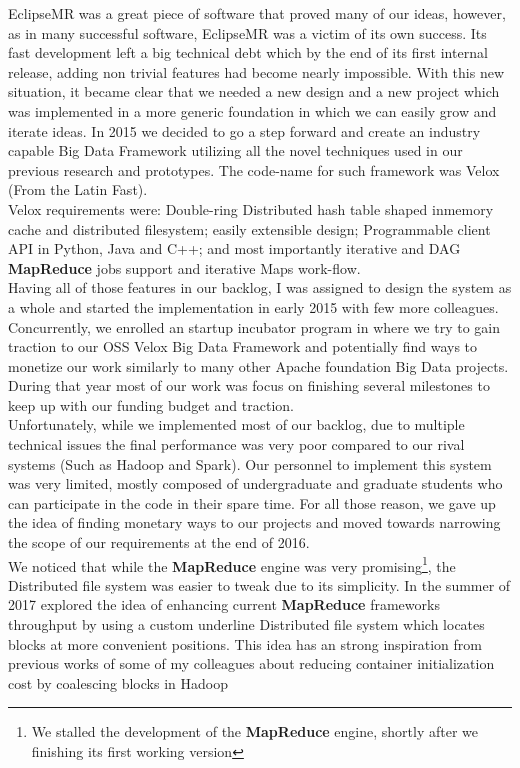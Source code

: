 EclipseMR was a great piece of software that proved many of our ideas, however,
as in many successful software, EclipseMR was a victim of its own success. Its
fast development left a big technical debt which by the end of its first
internal release, adding non trivial features had become nearly impossible.
With this new situation, it became clear that we needed a new design and a new
project which was implemented in a more generic foundation in which we can
easily grow and iterate ideas. In 2015 we decided to go a step forward and
create an industry capable Big Data Framework utilizing all the novel
techniques used in our previous research and prototypes. The code-name for such
framework was Velox (From the Latin Fast). \\ 

Velox requirements were: Double-ring Distributed hash table shaped inmemory
cache and distributed filesystem; easily extensible design; Programmable client
API in Python, Java and C++; and most importantly iterative and DAG
\textbf{MapReduce} jobs support and iterative Maps work-flow. \\

Having all of those features in our backlog, I was assigned to design the
system as a whole and started the implementation in early 2015 with few more
colleagues. Concurrently, we enrolled an startup incubator program in where we
try to gain traction to our OSS Velox Big Data Framework and potentially find
ways to monetize our work similarly to many other Apache foundation Big Data
projects. \\ During that year most of our work was focus on finishing several
milestones to keep up with our funding budget and traction. \\

Unfortunately, while we implemented most of our backlog, due to multiple
technical issues the final performance was very poor compared to our rival
systems (Such as Hadoop and Spark). Our personnel to implement this system was
very limited, mostly composed of undergraduate and graduate students who can
participate in the code in their spare time. For all those reason, we gave up
the idea of finding monetary ways to our projects and moved towards narrowing
the scope of our requirements at the end of 2016. \\

We noticed that while the \textbf{MapReduce} engine was very
promising\footnote{We stalled the development of the \textbf{MapReduce} engine,
shortly after we finishing its first working version}, the Distributed file
system was easier to tweak due to its simplicity. In the summer of 2017
explored the idea of enhancing current \textbf{MapReduce} frameworks throughput
by using a custom underline Distributed file system which locates blocks at
more convenient positions. This idea has an strong inspiration from previous
works of some of my colleagues about reducing container initialization cost by
coalescing blocks in Hadoop\cite{kim2017coalescing}\\

